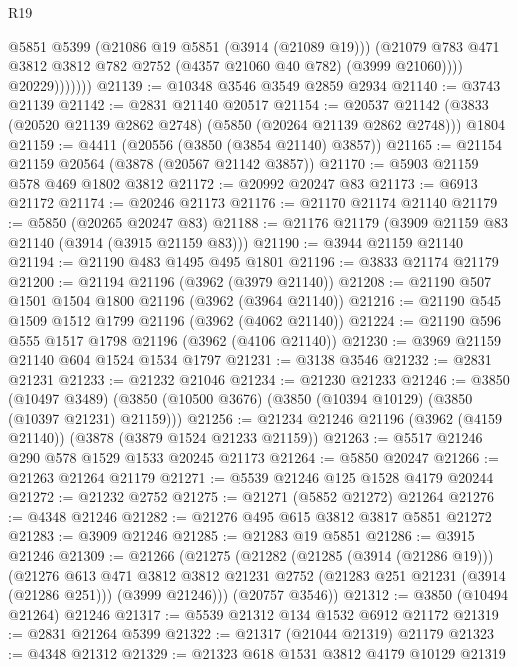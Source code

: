 \begin{lexlean}{R19}
\begin{coremodule}
                      @5851
                      @5399
                      (@21086 @19 @5851 (@3914 (@21089 @19)))
                      (@21079
                        @783
                        @471
                        @3812
                        @3812
                        @782
                        @2752
                        (@4357 @21060 @40 @782)
                        (@3999 @21060))))
                  @20229)))))))
@21139 := @10348 @3546 @3549 @2859 @2934
@21140 := @3743 @21139
@21142 := @2831 @21140 @20517
@21154 := @20537
    @21142
    (@3833 (@20520 @21139 @2862 @2748) (@5850 (@20264 @21139 @2862 @2748)))
    @1804
@21159 := @4411 (@20556 (@3850 (@3854 @21140) @3857))
@21165 := @21154 @21159 @20564 (@3878 (@20567 @21142 @3857))
@21170 := @5903 @21159 @578 @469 @1802 @3812
@21172 := @20992 @20247 @83
@21173 := @6913 @21172
@21174 := @20246 @21173
@21176 := @21170 @21174 @21140
@21179 := @5850 (@20265 @20247 @83)
@21188 := @21176 @21179 (@3909 @21159 @83 @21140 (@3914 (@3915 @21159 @83)))
@21190 := @3944 @21159 @21140
@21194 := @21190 @483 @1495 @495 @1801
@21196 := @3833 @21174 @21179
@21200 := @21194 @21196 (@3962 (@3979 @21140))
@21208 := @21190 @507 @1501 @1504 @1800 @21196 (@3962 (@3964 @21140))
@21216 := @21190 @545 @1509 @1512 @1799 @21196 (@3962 (@4062 @21140))
@21224 := @21190 @596 @555 @1517 @1798 @21196 (@3962 (@4106 @21140))
@21230 := @3969 @21159 @21140 @604 @1524 @1534 @1797
@21231 := @3138 @3546
@21232 := @2831 @21231
@21233 := @21232 @21046
@21234 := @21230 @21233
@21246 := @3850
    (@10497 @3489)
    (@3850 (@10500 @3676) (@3850 (@10394 @10129) (@3850 (@10397 @21231) @21159)))
@21256 := @21234 @21246 @21196 (@3962 (@4159 @21140)) (@3878 (@3879 @1524 @21233 @21159))
@21263 := @5517 @21246 @290 @578 @1529 @1533 @20245 @21173
@21264 := @5850 @20247
@21266 := @21263 @21264 @21179
@21271 := @5539 @21246 @125 @1528 @4179 @20244
@21272 := @21232 @2752
@21275 := @21271 (@5852 @21272) @21264
@21276 := @4348 @21246
@21282 := @21276 @495 @615 @3812 @3817 @5851 @21272
@21283 := @3909 @21246
@21285 := @21283 @19 @5851
@21286 := @3915 @21246
@21309 := @21266
    (@21275
      (@21282
        (@21285 (@3914 (@21286 @19)))
        (@21276
          @613
          @471
          @3812
          @3812
          @21231
          @2752
          (@21283 @251 @21231 (@3914 (@21286 @251)))
          (@3999 @21246)))
      (@20757 @3546))
@21312 := @3850 (@10494 @21264) @21246
@21317 := @5539 @21312 @134 @1532 @6912 @21172
@21319 := @2831 @21264 @5399
@21322 := @21317 (@21044 @21319) @21179
@21323 := @4348 @21312
@21329 := @21323 @618 @1531 @3812 @4179 @10129 @21319

\end{coremodule}
\end{lexlean}
